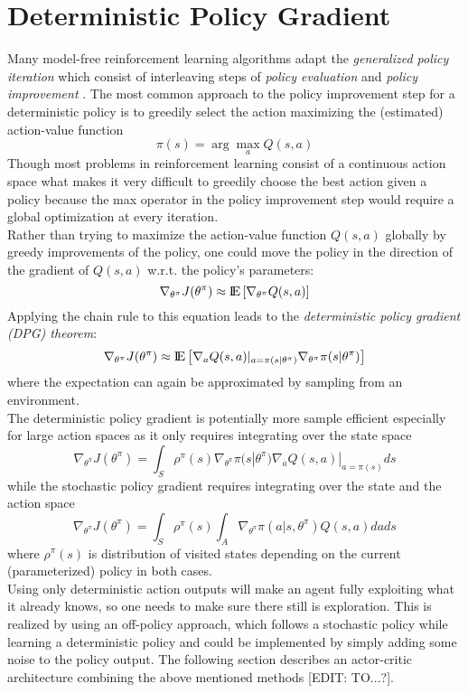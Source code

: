 \section{Deterministic Policy Gradient}
\label{sec:DPG}
Many model-free reinforcement learning algorithms adapt the \textit{generalized policy iteration} which consist of interleaving steps of \textit{policy evaluation} and \textit{policy improvement} \citep{sutton2018reinforcement}. The most common approach to the policy improvement step for a deterministic policy is to greedily select the action maximizing the (estimated) action-value function
\[
\pi(s) = \arg\max_a Q(s, a)
\]
Though most problems in reinforcement learning consist of a continuous action space what makes it very difficult to greedily choose the best action given a policy because the max operator in the policy improvement step would require a global optimization at every iteration.\\ 
Rather than trying to maximize the action-value function $Q(s,a)$ globally by greedy improvements of the policy, one could move the policy in the direction of the gradient of $Q(s,a)$ w.r.t. the policy's parameters:
\[
\nabla_{\theta^\pi}J(\theta^\pi)\approx {\rm I\!E}\left[\nabla_{\theta^\pi}Q(s,a)\right]
\]
Applying the chain rule to this equation leads to the \textit{deterministic policy gradient (DPG) theorem}:
\begin{align*}
\nabla_{\theta^\pi}J(\theta^\pi)\approx {\rm I\!E}\left[\nabla_aQ(s,a)|_{a=\pi(s|\theta^\pi)} \nabla_{\theta^\pi}\pi(s|\theta^\pi)\right]
\end{align*}
where the expectation can again be approximated by sampling from an environment.\\
The deterministic policy gradient is potentially more sample efficient especially for large action spaces as it only requires integrating over the state space
\[
\nabla_{\theta^\pi}J(\theta^\pi) = \int_{\mathit{S}}\rho^\pi(s) \nabla_{\theta^\pi}\pi(s|\theta^\pi)\nabla_a Q(s,a)|_{a=\pi(s)} ds
\]
while the stochastic policy gradient \citep{sutton2018reinforcement} requires integrating over the state and the action space
\[
\nabla_{\theta^\pi}J(\theta^\pi)=\int_{\mathit{S}}\rho^\pi(s)\int_{\mathit{A}}\nabla_{\theta^\pi}\pi(a|s,\theta^\pi)Q(s, a) da ds
\]
where $\rho^\pi(s)$ is distribution of visited states depending on the current (parameterized) policy in both cases.\\
Using only deterministic action outputs will make an agent fully exploiting what it already knows, so one needs to make sure there still is exploration. This is realized by using an off-policy approach, which follows a stochastic policy while learning a deterministic policy and could be implemented by simply adding some noise to the policy output. The following section describes an actor-critic architecture combining the above mentioned methods [EDIT: TO...?].


